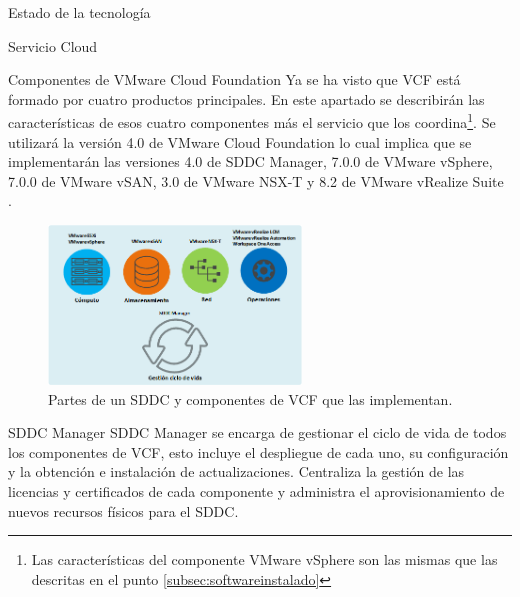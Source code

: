 \begin{chapter}{Estado de la tecnología}
\begin{section}{Servicio Cloud}
\begin{subsection}{Componentes de VMware Cloud Foundation}
    Ya se ha visto que VCF está formado por cuatro productos principales. En este apartado se describirán las características de esos cuatro componentes más el servicio que los coordina\footnote{Las características del componente VMware vSphere son las mismas que las descritas en el punto \ref{subsec:softwareinstalado}}. Se utilizará la versión 4.0 de VMware Cloud Foundation lo cual implica que se implementarán las versiones 4.0 de SDDC Manager, 7.0.0 de VMware vSphere, 7.0.0 de VMware vSAN, 3.0 de VMware NSX-T y 8.2 de VMware vRealize Suite \cite{componentesCloudFound}.
    \begin{figure}[h]
        \centering
            \includegraphics[width=0.6\textwidth]{imaxes/VCF-componentes/ComponentesVCF.png}
            \caption{Partes de un SDDC y componentes de VCF que las implementan.}
            \label{fig:componentes-funciones-VCF}
        \end{figure}
        \FloatBarrier
    \begin{subsubsection}{SDDC Manager}
        SDDC Manager se encarga de gestionar el ciclo de vida de todos los componentes de VCF, esto incluye el despliegue de cada uno, su configuración y la obtención e instalación de actualizaciones. Centraliza la gestión de las licencias y certificados de cada componente y administra el aprovisionamiento de nuevos recursos físicos para el SDDC.
    \end{subsubsection}
    

\end{subsection}
\end{section}
\end{chapter}
